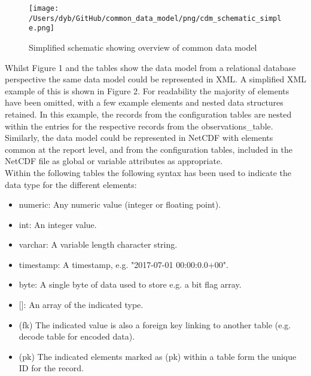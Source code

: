 \documentclass[a4paper]{article}
\begin{document}
\begin{figure}
\centering
\texttt{[image: /Users/dyb/GitHub/common\_data\_model/png/cdm\_schematic\_simple.png]}
\caption {Simplified schematic showing overview of common data model}
\end{figure}

\FloatBarrier

Whilst Figure 1 and the tables show the data model from a relational database perspective the same data model could be represented in XML. A simplified XML example of this is shown in Figure 2. For readability the majority of elements have been omitted, with a few example elements and nested data structures retained. In this example, the records from the configuration tables are nested within the entries for the respective records from the observations\_table. Similarly, the data model could be represented in NetCDF with elements common at the report level, and from the configuration tables, included in the NetCDF file as global or variable attributes as appropriate.\\

Within the following tables the following syntax has been used to indicate the data type for the different elements: \\
\begin{itemize}
\item numeric: \tabto{3 cm} Any numeric value (integer or floating point).
\item int: \tabto{3 cm} An integer value.
\item varchar: \tabto{3 cm} A variable length character string.
\item timestamp: \tabto{3 cm} A timestamp, e.g. "2017-07-01 00:00:0.0+00".
\item byte: \tabto{3 cm} A single byte of data used to store e.g. a bit flag array. 
\item {[]}:\tabto{3 cm} An array of the indicated type.
\item (fk)  \tabto{3 cm} The indicated value is also a foreign key linking to another table (e.g. decode table for encoded data).
\item (pk) \tabto{3 cm} The indicated elements marked as (pk) within a table form the unique ID for the record.
\end {itemize}
\end{document}
